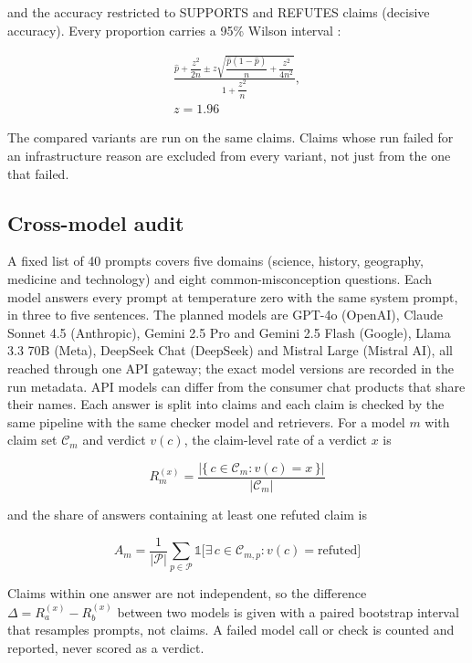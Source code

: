 \documentclass[conference]{IEEEtran}
\begin{document}
and the accuracy restricted to SUPPORTS and REFUTES claims (decisive accuracy). Every proportion carries a 95\% Wilson interval \cite{wilson1927}:

\begin{equation}
\begin{aligned}
\frac{\hat{p} + \dfrac{z^2}{2n} \pm z\sqrt{\dfrac{\hat{p}(1-\hat{p})}{n} + \dfrac{z^2}{4n^2}}}{1 + \dfrac{z^2}{n}}, \\
z = 1.96
\end{aligned}
\end{equation}

The compared variants are run on the same claims. Claims whose run failed for an infrastructure reason are excluded from every variant, not just from the one that failed.

\subsection{Cross-model audit}

A fixed list of 40 prompts covers five domains (science, history, geography, medicine and technology) and eight common-misconception questions. Each model answers every prompt at temperature zero with the same system prompt, in three to five sentences. The planned models are GPT-4o (OpenAI), Claude Sonnet 4.5 (Anthropic), Gemini 2.5 Pro and Gemini 2.5 Flash (Google), Llama 3.3 70B (Meta), DeepSeek Chat (DeepSeek) and Mistral Large (Mistral AI), all reached through one API gateway; the exact model versions are recorded in the run metadata. API models can differ from the consumer chat products that share their names. Each answer is split into claims and each claim is checked by the same pipeline with the same checker model and retrievers. For a model $m$ with claim set $\mathcal{C}_m$ and verdict $v(c)$, the claim-level rate of a verdict $x$ is

\begin{equation}
R_m^{(x)} = \frac{\bigl|\{\, c \in \mathcal{C}_m : v(c) = x \,\}\bigr|}{|\mathcal{C}_m|}
\end{equation}

and the share of answers containing at least one refuted claim is

\begin{equation}
A_m = \frac{1}{|\mathcal{P}|}\sum_{p \in \mathcal{P}} \mathbb{1}\bigl[\exists\, c \in \mathcal{C}_{m,p} : v(c) = \text{refuted}\bigr]
\end{equation}

Claims within one answer are not independent, so the difference $\Delta = R_a^{(x)} - R_b^{(x)}$ between two models is given with a paired bootstrap interval \cite{efron1979} that resamples prompts, not claims. A failed model call or check is counted and reported, never scored as a verdict.
\end{document}
